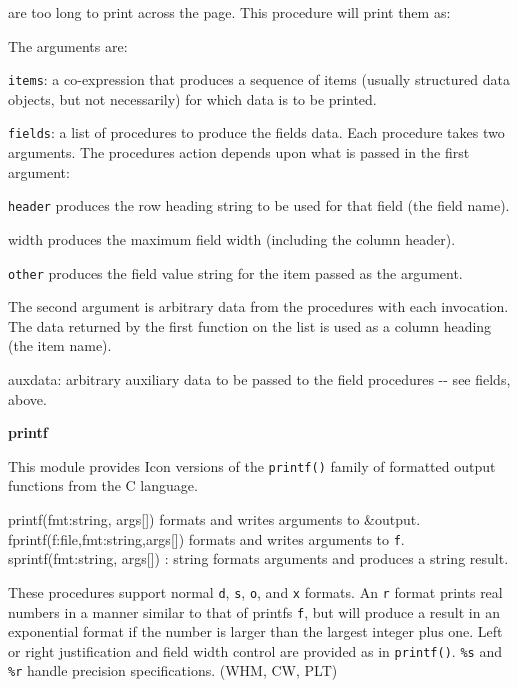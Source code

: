 are too long to print across the page. This procedure will print them
as:


The arguments are:

\texttt{items}: a co-expression that produces a sequence of items
(usually structured data objects, but not necessarily) for which data
is to be printed.

\texttt{fields}: a list of procedures to produce the
field{\textquotesingle}s data. Each procedure takes two arguments. The
procedure{\textquotesingle}s action depends upon what is passed in the
first argument:

\texttt{header} produces the row heading string to be used for that
field (the field name).

\textsf{width} produces the maximum field width (including the column
header).

\texttt{other} produces the field value string for the item passed as
the argument.

The second argument is arbitrary data from the procedures with each
invocation. The data returned by the first function on the list is used
as a column heading (the item name).

\textsf{auxdata}: arbitrary auxiliary data to be passed to the field
procedures -{}- see {\textasciigrave}fields{\textquotesingle}, above.

{\sffamily\bfseries
printf}

This module provides Icon versions of the
\texttt{printf()} family of formatted output functions
from the C language.

\textsf{printf(fmt:string, args[])} formats and writes arguments to
\textsf{\&output}.\\
\textsf{fprintf(f:file,fmt:string,args[])} formats and writes arguments
to \texttt{f}.\\
\textsf{sprintf(fmt:string, args[]) : string} formats arguments and
produces a string result.

These procedures support normal \texttt{d}, \texttt{s}, \texttt{o}, and
\texttt{x} formats. An \texttt{{\textquotedbl}r{\textquotedbl}} format
prints real numbers in a manner similar to that of
printf{\textquotesingle}s \texttt{{\textquotedbl}f{\textquotedbl}}, but
will produce a result in an exponential format if the number is larger
than the largest integer plus one. Left or right justification and
field width control are provided as in \texttt{printf()}. \texttt{\%s}
and \texttt{\%r} handle precision specifications. (WHM, CW, PLT)

